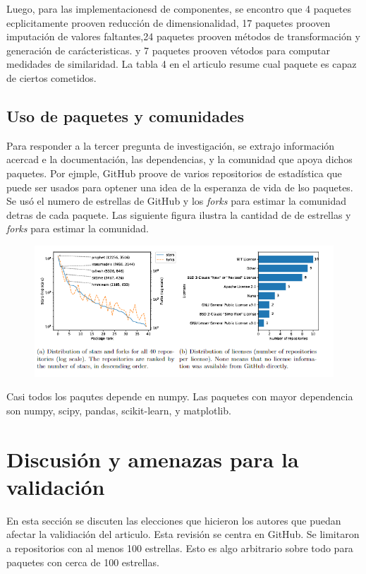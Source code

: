 \documentclass[a4paper, 11pt]{article}
\begin{document}
Luego, para las implementacionesd de componentes, se encontro que 4 paquetes ecplicitamente prooven reducción de dimensionalidad, 17 paquetes prooven imputación de valores faltantes,24 paquetes prooven métodos de transformación y generación de carácteristicas. y 7 paquetes prooven vétodos para computar medidades de similaridad. La tabla 4 en el articulo resume cual paquete es capaz de ciertos cometidos.

\subsection{Uso de paquetes y comunidades}

Para responder a la tercer pregunta de investigación, se extrajo información acercad e la documentación, las dependencias, y la comunidad que apoya dichos paquetes. Por ejmple, GitHub proove de varios repositorios de estadística que puede ser usados para optener una idea de la esperanza de vida de lso paquetes. Se usó el numero de estrellas de GitHub y los \textit{forks} para estimar la comunidad detras de cada paquete. Las siguiente figura ilustra la cantidad de de estrellas y \textit{forks} para estimar la comunidad.

\begin{figure}[H] 
    \centering 
    \includegraphics[width = 16 cm ]{Figures/stars.png } 
    \label{Fig. 02}
\end{figure} 

Casi todos los paqutes depende en numpy. Las paquetes con mayor dependencia son numpy, scipy, pandas, scikit-learn, y matplotlib.



\section{Discusión y amenazas para la validación}

En esta sección se discuten las elecciones que hicieron los autores que puedan afectar la validiación del articulo. Esta revisión se centra en GitHub. Se limitaron a repositorios con al menos 100 estrellas. Esto es algo arbitrario sobre todo para paquetes con cerca de 100 estrellas.
\end{document}
